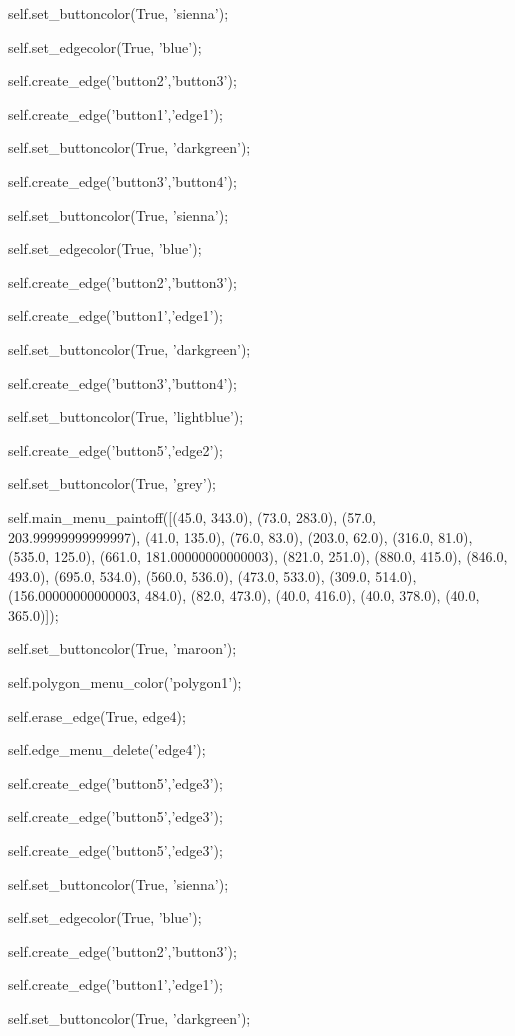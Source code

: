self.set_buttoncolor(True, 'sienna');

self.set_edgecolor(True, 'blue');




self.create_edge('button2','button3');

self.create_edge('button1','edge1');

self.set_buttoncolor(True, 'darkgreen');


self.create_edge('button3','button4');

self.set_buttoncolor(True, 'sienna');

self.set_edgecolor(True, 'blue');




self.create_edge('button2','button3');

self.create_edge('button1','edge1');

self.set_buttoncolor(True, 'darkgreen');


self.create_edge('button3','button4');

self.set_buttoncolor(True, 'lightblue');


self.create_edge('button5','edge2');

self.set_buttoncolor(True, 'grey');

self.main_menu_paintoff([(45.0, 343.0), (73.0, 283.0), (57.0, 203.99999999999997), (41.0, 135.0), (76.0, 83.0), (203.0, 62.0), (316.0, 81.0), (535.0, 125.0), (661.0, 181.00000000000003), (821.0, 251.0), (880.0, 415.0), (846.0, 493.0), (695.0, 534.0), (560.0, 536.0), (473.0, 533.0), (309.0, 514.0), (156.00000000000003, 484.0), (82.0, 473.0), (40.0, 416.0), (40.0, 378.0), (40.0, 365.0)]);

self.set_buttoncolor(True, 'maroon');

self.polygon_menu_color('polygon1');


self.erase_edge(True, edge4);

self.edge_menu_delete('edge4');

self.create_edge('button5','edge3');

self.create_edge('button5','edge3');

self.create_edge('button5','edge3');

self.set_buttoncolor(True, 'sienna');

self.set_edgecolor(True, 'blue');




self.create_edge('button2','button3');

self.create_edge('button1','edge1');

self.set_buttoncolor(True, 'darkgreen');


